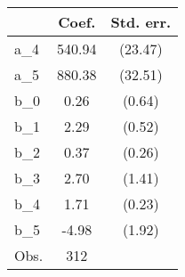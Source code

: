{
\def\sym#1{\ifmmode^{#1}\else\(^{#1}\)\fi}
\begin{tabular}{l*{1}{cc}}
\hline\hline
                &    Coef.&Std. err.\\
\hline
a\_4             &   540.94&  (23.47)\\
a\_5             &   880.38&  (32.51)\\
b\_0             &     0.26&   (0.64)\\
b\_1             &     2.29&   (0.52)\\
b\_2             &     0.37&   (0.26)\\
b\_3             &     2.70&   (1.41)\\
b\_4             &     1.71&   (0.23)\\
b\_5             &    -4.98&   (1.92)\\
\hline
Obs.            &      312&         \\
\hline\hline
\end{tabular}
}
